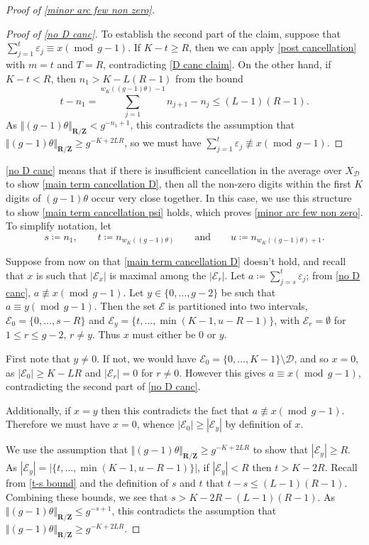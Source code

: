 \documentclass[hidelinks,11pt,reqno]{amsart}
\renewcommand{\leq}{\leqslant}
\renewcommand{\geq}{\geqslant}
\newcommand{\Z}{\ensuremath{\mathbf{Z}}}
\newcommand{\R}{\ensuremath{\mathbf{R}}}
\newcommand{\xbd}{X_{\mathcal{D}}}
\newcommand{\Vertr}{\Vert_{\R/\Z}}
\newcommand{\nequiv}{\not\equiv}
\newcommand{\V}[1]{\Vert #1 \Vertr}
\theoremstyle{remark}
\newcommand{\md}[1]{\ensuremath{(\operatorname{mod}\, #1)}}
\begin{document}
\begin{proof}[Proof of \cref{minor arc few non zero}]
\begin{proof}[Proof of \cref{no D canc}]
To establish the second part of the claim, suppose that $\sum_{j=1}^{t}\varepsilon_{j}\equiv x \md{g-1}$. If $K-t\geq R$, then we can apply \cref{post cancellation} with $m=t$ and $T=R$, contradicting \cref{D canc claim}. On the other hand, if $K-t<R$, then $n_{1}>K-L(R-1)$ from the bound\begin{equation}\label{t-s bound}
           t-n_{1}=\sum_{j=1}^{w_{K}((g-1)\theta)-1}n_{j+1}-n_{j}\leq (L-1)(R-1).
       \end{equation}
       As $\V{(g-1)\theta}<g^{-n_{1}+1}$, this contradicts the assumption that $\V{(g-1)\theta}\geq g^{-K+2LR}$, so we must have $\sum_{j=1}^{t}\varepsilon_{j}\nequiv x \md{g-1}$.
        \end{proof}
\cref{no D canc} means that if there is insufficient cancellation in the average over $\xbd$ to show \cref{main term cancellation D}, then all the non-zero digits within the first $K$ digits of $(g-1)\theta$ occur very close together. In this case, we use this structure to show \cref{main term cancellation psi} holds, which proves \cref{minor arc few non zero}. To simplify notation, let \[ s\coloneq n_{1}, \qquad t\coloneq n_{w_{K}((g-1)\theta)} \qquad \mbox{and} \qquad   u\coloneq n_{w_{K}((g-1)\theta)+1}.\]

Suppose from now on that \cref{main term cancellation D} doesn't hold, and recall that $x$ is such that $|\mathcal{E}_{x}|$ is maximal among the $|\mathcal{E}_{r}|$. Let $a\coloneq \sum_{j=s}^{t}\varepsilon_{j}$; from \cref{no D canc}, $a\nequiv x \md{g-1}$. Let $y\in\{0,\ldots, g-2\}$ be such that $a\equiv y \md{g-1}$. Then the set $\mathcal{E}$ is partitioned into two intervals, $\mathcal{E}_{0}=\{0,\ldots, s-R\}$ and $\mathcal{E}_{y}=\{t,\ldots, \min(K-1,u-R-1)\}$, with $\mathcal{E}_{r}=\emptyset$ for $1\leq r\leq g-2$, $r\neq y$. Thus $x$ must either be $0$ or $y$.

First note that $y\neq 0$. If not, we would have $\mathcal{E}_{0}=\{0,\ldots, K-1\}\setminus \mathcal{D}$, and so $x=0$, as $|\mathcal{E}_{0}|\geq K-LR$ and $|\mathcal{E}_{r}|=0$ for $r\neq 0$. However this gives $a\equiv x \md{g-1}$, contradicting the second part of \cref{no D canc}.

Additionally, if $x=y$ then this contradicts the fact that $a\nequiv x \md{g-1}$. Therefore we must have $x=0$, whence $|\mathcal{E}_{0}|\geq |\mathcal{E}_{y}|$ by definition of $x$.

We use the assumption that $\V{(g-1)\theta}\geq g^{-K+2LR}$ to show that $|\mathcal{E}_{y}|\geq R$. As $|\mathcal{E}_{y}|=|\{t,\ldots , \min(K-1,u-R-1)\}|$, if $|\mathcal{E}_{y}|<R$ then $t>K-2R$. Recall from \cref{t-s bound} and the definition of $s$ and $t$ that $t-s\leq (L-1)(R-1)$. Combining these bounds, we see that $s>K-2R-(L-1)(R-1)$. As $\V{(g-1)\theta}\leq g^{-s+1}$, this contradicts the assumption that $\V{(g-1)\theta}\geq g^{-K+2LR}$.


\end{proof}
\end{document}
